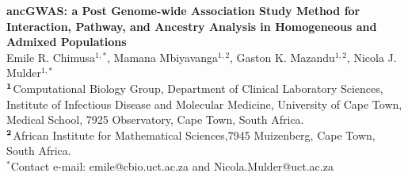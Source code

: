 \documentclass[10pt]{article}
\date{}
\begin{document}
\begin{flushleft}
{\Large
\textbf{ancGWAS: a Post Genome-wide Association Study Method for Interaction, Pathway, and Ancestry Analysis in Homogeneous and Admixed Populations}
}
\\
\vskip5mm
Emile R. Chimusa$^{1,\ast}$, 
Mamana Mbiyavanga$^{1,2}$, 
Gaston K. Mazandu$^{1,2}$,
Nicola J. Mulder$^{1,\ast}$
\\
\vskip5mm
$^{\bf{1}}$Computational Biology Group, Department of Clinical Laboratory Sciences, Institute of Infectious Disease and Molecular Medicine, University of Cape Town, Medical School, 7925 Observatory, Cape Town, South Africa.\\
$^{\bf{2}}$African Institute for Mathematical Sciences,7945 Muizenberg, Cape Town, South Africa.
\\
\vskip5mm
$^{\ast}$Contact e-mail: emile@cbio.uct.ac.za and Nicola.Mulder@uct.ac.za
\end{flushleft}






\end{document}
